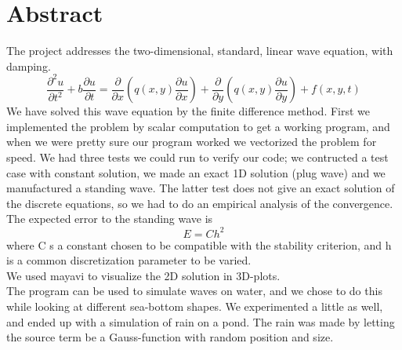 \section{Abstract}
The project addresses the two-dimensional, standard, linear wave equation, with damping.
\begin{equation}
 \frac{\partial^2 u}{\partial t^2} + b\frac{\partial u}{\partial t} = \frac{\partial}{\partial x} \left( q(x,y)\frac{\partial u}{\partial x} \right)
 + \frac{\partial}{\partial y} \left( q(x,y)\frac{\partial u}{\partial y} \right) + f(x,y,t)
 \label{wave_eq}
\end{equation}
We have solved this wave equation by the finite difference method. First we implemented the problem by scalar computation to get a working program, 
and when we were pretty sure our program worked we vectorized the problem for speed. We had three tests we could run to verify our code; we contructed a test case with constant solution,
we made an exact 1D solution (plug wave) and we manufactured a standing wave. The latter test does not give an exact solution of the discrete equations, so we had to do an
empirical analysis of the convergence. The expected error to the standing wave is 
\begin{equation}
 E = Ch^2
\end{equation}
where C s a constant chosen to be compatible with the stability criterion, and h is a common discretization parameter to be varied.\\
We used mayavi to visualize the 2D solution in 3D-plots.\\
The program can be used to simulate waves on water, and we chose to do this while looking at different sea-bottom shapes. We experimented a little as well,
and ended up with a simulation of rain on a pond. The rain was made by letting the source term be a Gauss-function with random position and size. 




